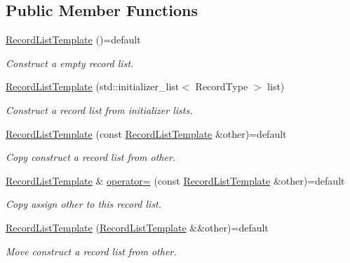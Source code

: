 \subsection*{Public Member Functions}
\begin{DoxyCompactItemize}
\item 
\hyperlink{class_mdt_1_1_plain_text_1_1_record_list_template_aafe80579c379230512b75b84e199661b}{Record\+List\+Template} ()=default
\begin{DoxyCompactList}\small\item\em Construct a empty record list. \end{DoxyCompactList}\item 
\hyperlink{class_mdt_1_1_plain_text_1_1_record_list_template_a7355c51d8c8f7218b46f1dbdd65fe514}{Record\+List\+Template} (std\+::initializer\+\_\+list$<$ Record\+Type $>$ list)
\begin{DoxyCompactList}\small\item\em Construct a record list from initializer lists. \end{DoxyCompactList}\item 
\hyperlink{class_mdt_1_1_plain_text_1_1_record_list_template_a09ac82a5ab35a269fbb3bb0a28d3f4fc}{Record\+List\+Template} (const \hyperlink{class_mdt_1_1_plain_text_1_1_record_list_template}{Record\+List\+Template} \&other)=default
\begin{DoxyCompactList}\small\item\em Copy construct a record list from {\itshape other}. \end{DoxyCompactList}\item 
\hyperlink{class_mdt_1_1_plain_text_1_1_record_list_template}{Record\+List\+Template} \& \hyperlink{class_mdt_1_1_plain_text_1_1_record_list_template_adb8412269238f4ac6359716124e5cc7c}{operator=} (const \hyperlink{class_mdt_1_1_plain_text_1_1_record_list_template}{Record\+List\+Template} \&other)=default
\begin{DoxyCompactList}\small\item\em Copy assign {\itshape other} to this record list. \end{DoxyCompactList}\item 
\hyperlink{class_mdt_1_1_plain_text_1_1_record_list_template_ac0420a409eaa29f9716662faec808bb2}{Record\+List\+Template} (\hyperlink{class_mdt_1_1_plain_text_1_1_record_list_template}{Record\+List\+Template} \&\&other)=default
\begin{DoxyCompactList}\small\item\em Move construct a record list from {\itshape other}. \end{DoxyCompactList}\item 

\end{DoxyCompactItemize}
